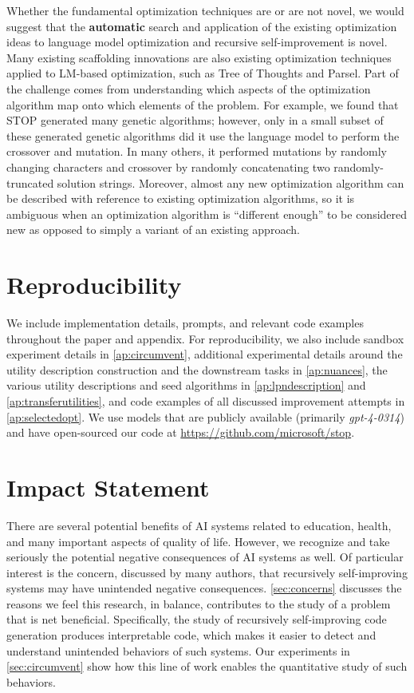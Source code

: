 \documentclass{article}
\begin{document}
Whether the fundamental optimization techniques are or are not novel, we would suggest that the \textbf{automatic} search and application of the existing optimization ideas to language model optimization and recursive self-improvement is novel. Many existing scaffolding innovations are also existing optimization techniques applied to LM-based optimization, such as Tree of Thoughts and Parsel. Part of the challenge comes from understanding which aspects of the optimization algorithm map onto which elements of the problem. For example, we found that STOP generated many genetic algorithms; however, only in a small subset of these generated genetic algorithms did it use the language model to perform the crossover and mutation. In many others, it performed mutations by randomly changing characters and crossover by randomly concatenating two randomly-truncated solution strings. Moreover, almost any new optimization algorithm can be described with reference to existing optimization algorithms, so it is ambiguous when an optimization algorithm is “different enough” to be considered new as opposed to simply a variant of an existing approach.




\section{Reproducibility}
We include implementation details, prompts, and relevant code examples throughout the paper and appendix. For reproducibility, we also include sandbox experiment details in
\cref{ap:circumvent}, additional experimental details around the utility description construction and the downstream tasks in 
\cref{ap:nuances}, the various utility descriptions and seed algorithms in 
\cref{ap:lpndescription} and \cref{ap:transferutilities},
and code examples of all discussed improvement attempts in 
\cref{ap:selectedopt}.
We use models that are publicly available (primarily \textit{gpt-4-0314}) and have open-sourced our code at \url{https://github.com/microsoft/stop}.

\section{Impact Statement}
There are several potential benefits of AI systems related to education, health, and many important aspects of quality of life. However, we recognize and take seriously the potential negative consequences of AI systems as well. Of particular interest is the concern, discussed by many authors,   that recursively self-improving systems may have unintended negative consequences. \cref{sec:concerns} discusses the reasons we feel this research, in balance, contributes to the study of a problem that is net beneficial. Specifically, the study of recursively self-improving code generation produces interpretable code, which makes it easier to detect and understand unintended behaviors of such systems. Our experiments in \cref{sec:circumvent} show how this line of work enables the quantitative study of such behaviors.
\end{document}
